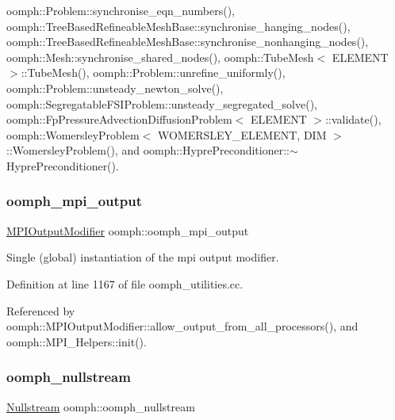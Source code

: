 oomph\+::\+Problem\+::synchronise\+\_\+eqn\+\_\+numbers(), oomph\+::\+Tree\+Based\+Refineable\+Mesh\+Base\+::synchronise\+\_\+hanging\+\_\+nodes(), oomph\+::\+Tree\+Based\+Refineable\+Mesh\+Base\+::synchronise\+\_\+nonhanging\+\_\+nodes(), oomph\+::\+Mesh\+::synchronise\+\_\+shared\+\_\+nodes(), oomph\+::\+Tube\+Mesh$<$ E\+L\+E\+M\+E\+N\+T $>$\+::\+Tube\+Mesh(), oomph\+::\+Problem\+::unrefine\+\_\+uniformly(), oomph\+::\+Problem\+::unsteady\+\_\+newton\+\_\+solve(), oomph\+::\+Segregatable\+F\+S\+I\+Problem\+::unsteady\+\_\+segregated\+\_\+solve(), oomph\+::\+Fp\+Pressure\+Advection\+Diffusion\+Problem$<$ E\+L\+E\+M\+E\+N\+T $>$\+::validate(), oomph\+::\+Womersley\+Problem$<$ W\+O\+M\+E\+R\+S\+L\+E\+Y\+\_\+\+E\+L\+E\+M\+E\+N\+T, D\+I\+M $>$\+::\+Womersley\+Problem(), and oomph\+::\+Hypre\+Preconditioner\+::$\sim$\+Hypre\+Preconditioner().

\mbox{\label{namespaceoomph_ad23588cc980c3f75478368f9c4172b9a}} 
\subsubsection{\texorpdfstring{oomph\+\_\+mpi\+\_\+output}{oomph\_mpi\_output}}
{\footnotesize\ttfamily \hyperlink{classoomph_1_1MPIOutputModifier}{M\+P\+I\+Output\+Modifier} oomph\+::oomph\+\_\+mpi\+\_\+output}



Single (global) instantiation of the mpi output modifier. 



Definition at line 1167 of file oomph\+\_\+utilities.\+cc.



Referenced by oomph\+::\+M\+P\+I\+Output\+Modifier\+::allow\+\_\+output\+\_\+from\+\_\+all\+\_\+processors(), and oomph\+::\+M\+P\+I\+\_\+\+Helpers\+::init().

\mbox{\label{namespaceoomph_a71421688cd14bcbb18a23c64b7245941}} 
\subsubsection{\texorpdfstring{oomph\+\_\+nullstream}{oomph\_nullstream}}
{\footnotesize\ttfamily \hyperlink{classoomph_1_1Nullstream}{Nullstream} oomph\+::oomph\+\_\+nullstream}



